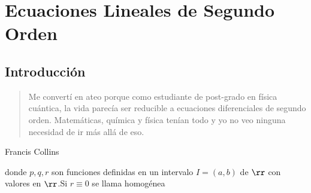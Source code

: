 \chapter{Ecuaciones Lineales de Segundo Orden}

%








\section{Introducción}


\begin{quote}
Me convertí en ateo porque como estudiante de  post-grado en física cuántica, la vida parecía ser reducible a ecuaciones diferenciales de segundo orden. Matemáticas, 
química y física tenían todo y yo no veo ninguna necesidad de ir más allá de eso.
\end{quote}
\begin{flushright}
Francis Collins
\end{flushright}




\begin{definicion}{}
donde $p,q,r$ son funciones definidas en un intervalo $I=(a,b)$ de $\rr$ con valores en $\rr$.Si $r\equiv 0$ se llama homogénea
\end{definicion}







